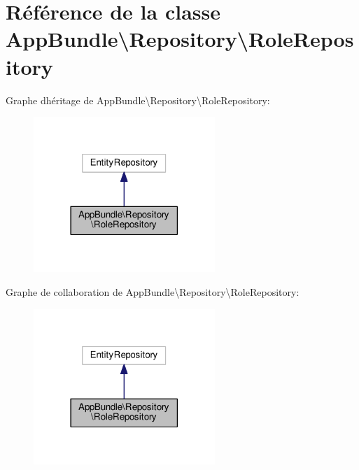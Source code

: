 \hypertarget{classAppBundle_1_1Repository_1_1RoleRepository}{}\section{Référence de la classe App\+Bundle\textbackslash{}Repository\textbackslash{}Role\+Repository}
\label{classAppBundle_1_1Repository_1_1RoleRepository}


Graphe d\textquotesingle{}héritage de App\+Bundle\textbackslash{}Repository\textbackslash{}Role\+Repository\+:\nopagebreak
\begin{figure}[H]
\begin{center}
\leavevmode
\includegraphics[width=194pt]{classAppBundle_1_1Repository_1_1RoleRepository__inherit__graph}
\end{center}
\end{figure}


Graphe de collaboration de App\+Bundle\textbackslash{}Repository\textbackslash{}Role\+Repository\+:\nopagebreak
\begin{figure}[H]
\begin{center}
\leavevmode
\includegraphics[width=194pt]{classAppBundle_1_1Repository_1_1RoleRepository__coll__graph}
\end{center}
\end{figure}



